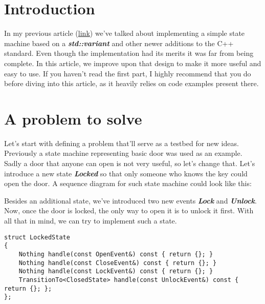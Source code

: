\documentclass{article}[8pt]
\newcommand{\code}[1]{\textbf{\textit{#1}}}
\newcommand{\locked}{\code{Locked}}
\newcommand{\lock}{\code{Lock}}
\newcommand{\unlock}{\code{Unlock}}
\begin{document}
\section*{Introduction}
In my previous article (\href{https://sii.pl/blog/implementing-a-state-machine-in-c17/}{link}) we've talked about implementing a simple state machine based on a \code{std::variant} and other newer additions to the C++ standard.
Even though the implementation had its merits it was far from being complete. In this article, we improve upon that design to make it more useful and easy to use. If you haven't read the first part, I highly recommend that you do before diving into this article, as it heavily relies on code examples present there.

\section*{A problem to solve}

Let's start with defining a problem that'll serve as a testbed for new ideas. Previously a state machine representing basic door was used as an example. Sadly a door that anyone can open is not very useful, so let's change that. Let's introduce a new state \locked{} so that only someone who knows the key could open the door. A sequence diagram for such state machine could look like this:


Besides an additional state, we've introduced two new events \lock{} and \unlock{}. Now, once the door is locked, the only way to open it is to unlock it first. With all that in mind, we can try to implement such a state.

\bigskip
\begin{verbatim}
struct LockedState
{
    Nothing handle(const OpenEvent&) const { return {}; }
    Nothing handle(const CloseEvent&) const { return {}; }
    Nothing handle(const LockEvent&) const { return {}; }
    TransitionTo<ClosedState> handle(const UnlockEvent&) const { return {}; };
};
\end{verbatim}
\bigskip
\end{document}
